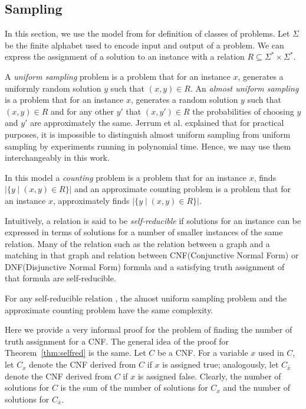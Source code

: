 \subsection*{Sampling}
In this section, we use the model from \cite{JVV} for definition of classes of problems.
Let \(\Sigma\) be the finite alphabet used to encode input and output of a problem. 
We can express the assignment of a solution to an instance with a relation 
\(R \subseteq \Sigma^* \times \Sigma^*\)\@.

A \emph{uniform sampling} problem is a problem that for an instance \(x\),
generates a uniformly random solution \(y\) such that \((x,y) \in R\)\@.
An \emph{almost uniform sampling} is a problem that for an instance \(x\),
generates a random solution \(y\) 
such that \((x,y) \in R\) and for any other \(y'\) that \((x,y')\in R\) the 
probabilities of choosing \(y\) and \(y'\) are approximately the same.
Jerrum et al. \cite{JVV} explained that for practical purposes, it is impossible to distinguish
almost uniform sampling from uniform sampling by experiments running in polynomial time.
Hence, we may use them interchangeably in this work.

In this model a \emph{counting} problem is a problem that for an instance \(x\),
finds \(|\{y \mid (x,y) \in R\}|\) and an approximate counting
problem is a problem that for an instance \(x\), approximately 
finds \(|\{y \mid (x,y) \in R\}|\)\@.

Intuitively, a relation is said to be \emph{self-reducible} if solutions for an instance can be
expressed in terms of solutions for a number of smaller instances of the same relation.
Many of the relation such as the relation between a graph and a matching in that graph
and relation between CNF(Conjunctive Normal Form) or DNF(Disjunctive Normal Form) formula and
a satisfying truth assignment of that formula are self-reducible.

\begin{theorem}  \label{thm:selfred}
For any self-reducible relation \mR, the almost uniform sampling problem and the approximate counting
problem have the same complexity.
\end{theorem}

Here we provide a very informal 
proof for the problem of finding the number of truth assignment for a CNF\@.
The general idea of the proof for Theorem~\ref{thm:selfred} is the same.
Let \(C\) be a CNF\@.
For a variable \(x\) used in \(C\), let \(C_x\) denote 
the CNF derived from \(C\) if \(x\) is assigned true; analogously, let \(C_{\bar x}\) denote
the CNF derived from \(C\) if \(x\) is assigned false. Clearly, the number of solutions for
\(C\) is the sum of the number of solutions for \(C_x\) and the number of solutions 
for \(C_{\bar x}\)\@.

